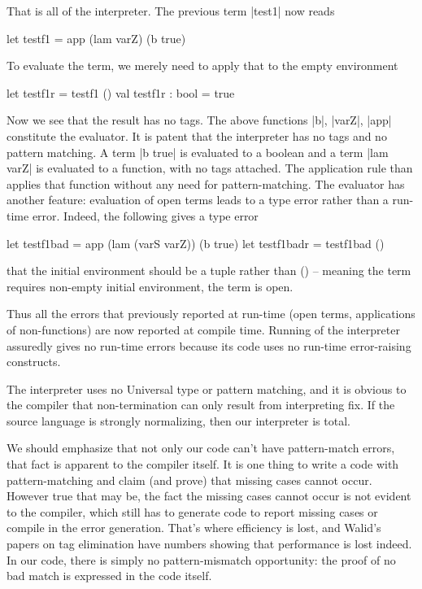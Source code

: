 That is all of the interpreter. The previous term |test1| now reads
\begin{code}
  let testf1 = app (lam varZ) (b true)
\end{code}

To evaluate the term, we merely need to apply that to the empty
environment

\begin{code}
  let testf1r = testf1 ()
  val testf1r : bool = true
\end{code}

Now we see that the result has no tags. The above functions |b|,
|varZ|, |app| constitute the evaluator. It is patent that the
interpreter has no tags and no pattern matching. A term |b true| is
evaluated to a boolean and a term |lam varZ| is evaluated to a
function, with no tags attached. The application rule than applies that
function without any need for pattern-matching. The evaluator has
another feature: evaluation of open terms leads to a type error rather
than a run-time error. Indeed, the following gives a type error

\begin{code}
  let testf1bad = app (lam (varS varZ)) (b true)
  let testf1badr = testf1bad ()
\end{code}
that the initial environment should be a tuple rather than () --
meaning the term requires non-empty initial environment, the term is
open.

Thus all the errors that previously reported at run-time (open terms,
applications of non-functions) are now reported at compile
time. Running of the interpreter assuredly gives no run-time errors
because its code uses no run-time error-raising constructs.



The interpreter uses no Universal type or pattern matching, and it
is obvious to the compiler that non-termination can only result from
interpreting fix.  If the source language is strongly normalizing, then
our interpreter is total.

We should emphasize that not only our code can't have pattern-match
errors, that fact is apparent to the compiler itself. It is one thing
to write a code with pattern-matching and claim (and prove) that
missing cases cannot occur. However true that may be, the fact the
missing cases cannot occur is not evident to the compiler, which still
has to generate code to report missing cases or compile in the error
generation. That's where efficiency is lost, and Walid's papers on tag
elimination have numbers showing that performance is lost indeed. 
In our code, there is simply no pattern-mismatch opportunity: the
proof of no bad match is expressed in the code itself. 


